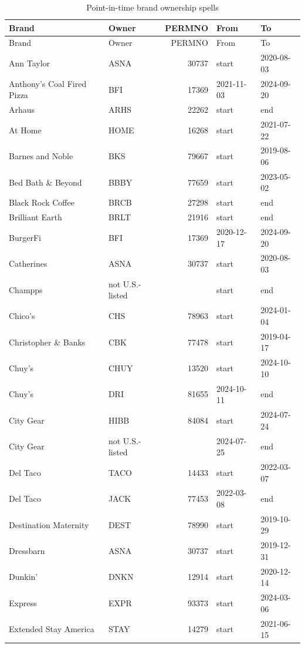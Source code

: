 \begin{longtable}{>{\raggedright\arraybackslash}p{5.2cm}lrll}
\caption{Point-in-time brand ownership spells}\label{tab:overrides}\\
\toprule Brand & Owner & PERMNO & From & To \\ \midrule\endfirsthead
\toprule Brand & Owner & PERMNO & From & To \\ \midrule\endhead
Ann Taylor & ASNA & 30737 & start & 2020-08-03 \\
Anthony's Coal Fired Pizza & BFI & 17369 & 2021-11-03 & 2024-09-20 \\
Arhaus & ARHS & 22262 & start & end \\
At Home & HOME & 16268 & start & 2021-07-22 \\
Barnes and Noble & BKS & 79667 & start & 2019-08-06 \\
Bed Bath \& Beyond & BBBY & 77659 & start & 2023-05-02 \\
Black Rock Coffee & BRCB & 27298 & start & end \\
Brilliant Earth & BRLT & 21916 & start & end \\
BurgerFi & BFI & 17369 & 2020-12-17 & 2024-09-20 \\
Catherines & ASNA & 30737 & start & 2020-08-03 \\
Champps & not U.S.-listed &  & start & end \\
Chico's & CHS & 78963 & start & 2024-01-04 \\
Christopher \& Banks & CBK & 77478 & start & 2019-04-17 \\
Chuy's & CHUY & 13520 & start & 2024-10-10 \\
Chuy's & DRI & 81655 & 2024-10-11 & end \\
City Gear & HIBB & 84084 & start & 2024-07-24 \\
City Gear & not U.S.-listed &  & 2024-07-25 & end \\
Del Taco & TACO & 14433 & start & 2022-03-07 \\
Del Taco & JACK & 77453 & 2022-03-08 & end \\
Destination Maternity & DEST & 78990 & start & 2019-10-29 \\
Dressbarn & ASNA & 30737 & start & 2019-12-31 \\
Dunkin' & DNKN & 12914 & start & 2020-12-14 \\
Express & EXPR & 93373 & start & 2024-03-06 \\
Extended Stay America & STAY & 14279 & start & 2021-06-15 \\

\end{longtable}
